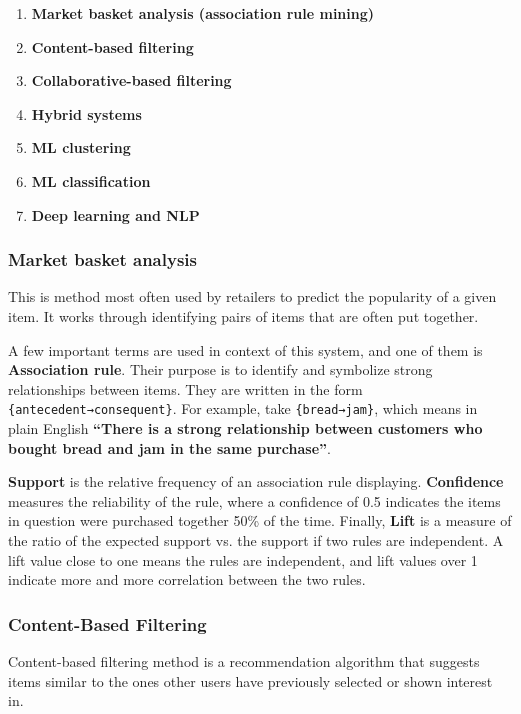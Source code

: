 \documentclass{article}
\begin{document}
\begin{enumerate}
	\item{\textbf{Market basket analysis (association rule mining)}}
	\item{\textbf{Content-based filtering}}
	\item{\textbf{Collaborative-based filtering}}
	\item{\textbf{Hybrid systems}}
	\item{\textbf{ML clustering}}
	\item{\textbf{ML classification}}
	\item{\textbf{Deep learning and NLP}}
\end{enumerate}

\subsubsection{Market basket analysis}

This is method most often used by retailers to predict the popularity of a given item. It works through identifying pairs of items that are often put together.

\medskip

\noindent A few important terms are used in context of this system, and one of them is \textbf{Association rule}. Their purpose is to identify and symbolize strong relationships between items. They are written in the form \texttt{\{antecedent→consequent\}}. For example, take \texttt{\{bread→jam\}}, which means in plain English \textbf{``There is a strong relationship between customers who bought bread and jam in the same purchase''}.

\medskip

\noindent \textbf{Support} is the relative frequency of an association rule displaying. \textbf{Confidence} measures the reliability of the rule, where a confidence of 0.5 indicates the items in question were purchased together 50\% of the time. Finally, \textbf{Lift} is a measure of the ratio of the expected support vs. the support if two rules are independent. A lift value close to one means the rules are independent, and lift values over 1 indicate more and more correlation between the two rules.

\subsubsection{Content-Based Filtering}

\noindent Content-based filtering method is a recommendation algorithm that suggests items similar to the ones other users have previously selected or shown interest in.
\end{document}
